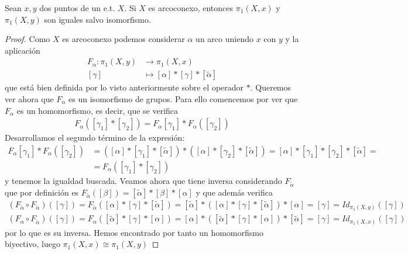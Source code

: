 \begin{teo}
    Sean $x,y$ dos puntos de un e.t. $X$. Si $X$ es arcoconexo, entonces $\pi_1(X,x)$ y $\pi_1(X,y)$ son iguales salvo isomorfismo.
    \begin{proof}
        Como $X$ es arcoconexo podemos considerar $\alpha$ un arco uniendo $x$ con $y$ y la aplicación
        \begin{align*}
            F_\alpha : \pi_1(X,y) &\to \pi_1(X,x)\\
            [\gamma] & \mapsto [\alpha]\ast[\gamma]\ast[\tilde{\alpha}]
        \end{align*}
        que está bien definida por lo visto anteriormente sobre el operador $\ast$. Queremos ver ahora que $F_\alpha$ es un isomorfismo de grupos. Para ello comencemos por ver que $F_\alpha$ es un homomorfismo, es decir, que se verifica
        \begin{gather*}
            F_\alpha([\gamma_1] \ast [\gamma_2]) = F_\alpha[\gamma_1]\ast F_\alpha([\gamma_2])
        \end{gather*}
        Desarrollamos el segundo término de la expresión:
        \begin{align*}
            F_\alpha[\gamma_1]\ast F_\alpha([\gamma_2]) &= ([\alpha] \ast [\gamma_1] \ast [\tilde{\alpha}]) \ast ([\alpha] \ast [\gamma_2] \ast [\tilde{\alpha}]) = [\alpha] \ast [\gamma_1] \ast [\gamma_2] \ast [\tilde{\alpha}] =\\
            &= F_\alpha([\gamma_1] \ast [\gamma_2])
        \end{align*}
        y tenemos la igualdad buscada. Veamos ahora que tiene inversa considerando $F_{\tilde{\alpha}}$ que por definición es $F_{\tilde{\alpha}}([\beta]) = [\tilde{\alpha}] \ast [\beta] \ast [\alpha]$ y que además verifica
        \begin{gather*}
            (F_{\tilde{\alpha}} \circ F_{\tilde{\alpha}})([\gamma]) = F_{\tilde{\alpha}}([\alpha]\ast [\gamma]\ast [\tilde{\alpha}]) = [\tilde{\alpha}] \ast ([\alpha]\ast [\gamma]\ast [\tilde{\alpha}]) \ast [\alpha] = [\gamma] = Id_{\pi_1(X,y)}([\gamma])\\
            (F_\alpha \circ F_{\tilde{\alpha}})([\gamma]) = F_\alpha([\tilde{\alpha}] \ast [\gamma] \ast [\alpha]) = [\alpha] \ast ([\tilde{\alpha}] \ast [\gamma] \ast [\alpha]) \ast [\tilde{\alpha}] = [\gamma] = Id_{\pi_1(X,x)}([\gamma])
        \end{gather*}
        por lo que es su inversa. Hemos encontrado por tanto un homomorfismo biyectivo, luego $\pi_1(X,x) \cong \pi_1(X,y)$
    \end{proof}
\end{teo}

